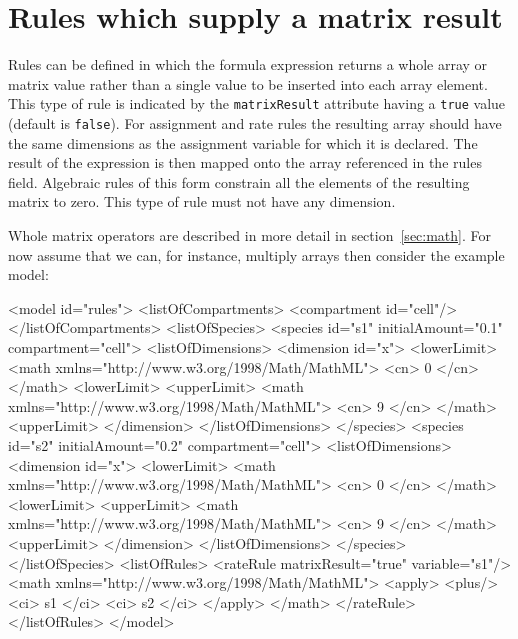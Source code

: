 \documentclass{cekarticle}
\begin{document}
\section{Rules which supply a matrix result}

Rules can be defined 
in which the formula expression returns a whole
array or matrix value rather than a single value to be inserted into each
array element.  This type of rule is indicated by the \texttt{matrixResult}
attribute having a \texttt{true} value (default is \texttt{false}).
For assignment and rate rules the resulting array should have the same dimensions as the assignment variable
for which it is declared.  The result of the expression is then mapped onto
the array referenced in the rules  field.
Algebraic rules of this form constrain all the elements of the resulting matrix to zero. 
This type of rule must not have any dimension.

Whole matrix operators are described in
more detail in section~\ref{sec:math}.  For now assume that we
can, for instance, multiply arrays then consider the example
model:

\begin{example}
<model id="rules">
    <listOfCompartments>
        <compartment id="cell"/>
    </listOfCompartments>
    <listOfSpecies>
        <species id="s1" initialAmount="0.1" compartment="cell">
            <listOfDimensions>
                <dimension id="x">
                    <lowerLimit>
                        <math xmlns="http://www.w3.org/1998/Math/MathML">
                            <cn> 0 </cn>
                        </math>
                    <lowerLimit>
                    <upperLimit>
                        <math xmlns="http://www.w3.org/1998/Math/MathML">
                            <cn> 9 </cn>
                        </math>
                    <upperLimit>
                </dimension>
            </listOfDimensions>
        </species>
        <species id="s2" initialAmount="0.2" compartment="cell">
            <listOfDimensions>
                <dimension id="x">
                    <lowerLimit>
                        <math xmlns="http://www.w3.org/1998/Math/MathML">
                            <cn> 0 </cn>
                        </math>
                    <lowerLimit>
                    <upperLimit>
                        <math xmlns="http://www.w3.org/1998/Math/MathML">
                            <cn> 9 </cn>
                        </math>
                    <upperLimit>
                </dimension>
            </listOfDimensions>
        </species>
    </listOfSpecies>
    <listOfRules>
        <rateRule matrixResult="true" variable="s1"/>
            <math xmlns="http://www.w3.org/1998/Math/MathML">
                <apply>
                    <plus/>
                    <ci> s1 </ci>
                    <ci> s2 </ci>
                </apply>
            </math>
        </rateRule>
    </listOfRules>
</model>
\end{example}
\end{document}
